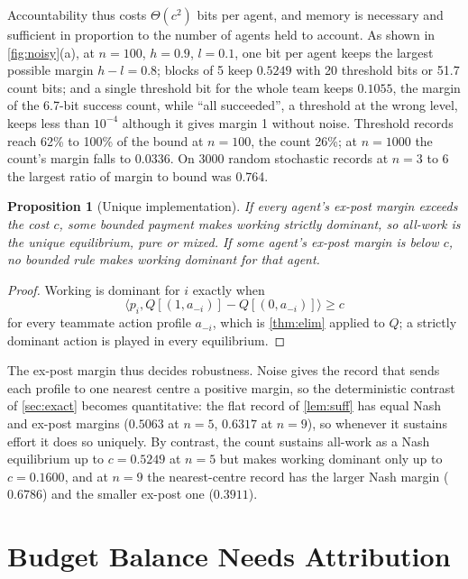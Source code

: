 \documentclass[sigconf,anonymous,acmthm=false]{acmart}
\theoremstyle{acmplain}
\newtheorem{proposition}{Proposition}
\theoremstyle{acmdefinition}
\begin{document}
Accountability thus costs $\Theta(c^2)$ bits per agent, and memory is necessary and sufficient
in proportion to the number of agents held to account. As shown in \cref{fig:noisy}(a), at
$n=100$, $h=0.9$, $l=0.1$, one bit per agent keeps the largest possible margin $h-l=0.8$;
blocks of 5 keep $0.5249$ with 20 threshold bits or 51.7 count bits; and a single threshold
bit for the whole team keeps $0.1055$, the margin of the 6.7-bit success count, while ``all
succeeded'', a threshold at the wrong level, keeps less than $10^{-4}$ although it gives
margin 1 without noise. Threshold records reach 62\% to 100\% of the bound at $n=100$, the
count 26\%; at $n=1000$ the count's margin falls to $0.0336$. On 3000 random stochastic
records at $n=3$ to 6 the largest ratio of margin to bound was 0.764.

\begin{proposition}[Unique implementation]\label{prop:unique}
If every agent's ex-post margin exceeds the cost $c$, some bounded payment makes working
strictly dominant, so all-work is the unique equilibrium, pure or mixed. If some agent's
ex-post margin is below $c$, no bounded rule makes working dominant for that agent.
\end{proposition}
\begin{proof}
Working is dominant for $i$ exactly when
\[ \langle p_i,Q[(1,a_{-i})]-Q[(0,a_{-i})]\rangle\ge c \]
for every teammate action profile $a_{-i}$, which is \cref{thm:elim} applied to $Q$; a strictly dominant action is played in
every equilibrium.
\end{proof}

The ex-post margin thus decides robustness. Noise gives the record that sends each profile to
one nearest centre a positive margin, so the deterministic contrast of \cref{sec:exact}
becomes quantitative: the flat record of \cref{lem:suff} has equal Nash and ex-post margins
($0.5063$ at $n=5$, $0.6317$ at $n=9$), so whenever it sustains effort it does so uniquely.
By contrast, the count sustains all-work as a Nash equilibrium up to $c=0.5249$ at $n=5$ but
makes working dominant only up to $c=0.1600$, and at $n=9$ the nearest-centre record has
the larger Nash margin ($0.6786$) and the smaller ex-post one ($0.3911$).

\section{Budget Balance Needs Attribution}\label{sec:bb}
\end{document}
